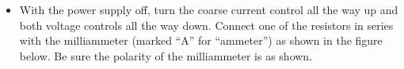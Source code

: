 \begin{itemize}
\item With the power supply off, turn the coarse current control all the way up 
and both voltage controls all the way down.  Connect one of the resistors in 
series with the milliammeter (marked ``A'' for ``ammeter'') as shown in the 
figure below. Be sure the polarity of the milliammeter is as shown.
\end{itemize}
\vspace{0.3cm}
{\centering {} \par}
\vspace{0.3cm}

